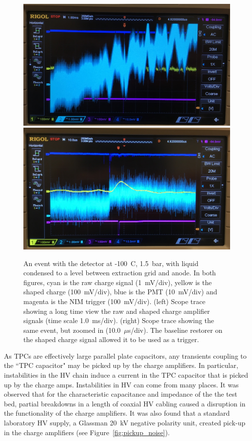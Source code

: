 \begin{figure}[htbp]
\begin{center}
\includegraphics[width = \halffig, keepaspectratio]{figures/testbed/baseline_wander.jpg}
\includegraphics[width = \halffig, keepaspectratio]{figures/testbed/baseline_wander_zoom.jpg}
\caption{An event with the detector at  -100~C, 1.5~bar, with liquid condensed to a level between extraction grid and anode. In both figures, cyan is the raw charge signal (1~mV/div), yellow is the shaped charge (100~mV/div), blue is the \acs{PMT} (10~mV/div) and magenta is the \acs{NIM} trigger (100~mV/div). (left) Scope trace showing a long time view the raw and shaped charge amplifier signals (time scale 1.0~ms/div). (right) Scope trace showing the same event, but zoomed in (10.0~$\mu$s/div). The baseline restorer on the shaped charge signal allowed it to be used as a trigger.}
\label{fig:amp_noise2}
\end{center}
\end{figure}


As \ac{TPC}s are effectively large parallel plate capacitors, any transients coupling to the ``\ac{TPC} capacitor" may be picked up by the charge amplifiers. In particular, instabilities in the \ac{HV} chain induce a current in the \ac{TPC} capacitor that is picked up by the charge amps. Instabilities in \ac{HV} can come from many places. It was observed that for the characteristic capacitance and impedance of the the test bed, partial breakdowns in a length of coaxial \ac{HV} cabling caused a disruption in the functionality of the charge amplifiers. It was also found that a standard laboratory \ac{HV} supply, a Glassman 20~kV negative polarity unit, created pick-up in the charge amplifiers (see Figure~\ref{fig:pickup_noise}).  

